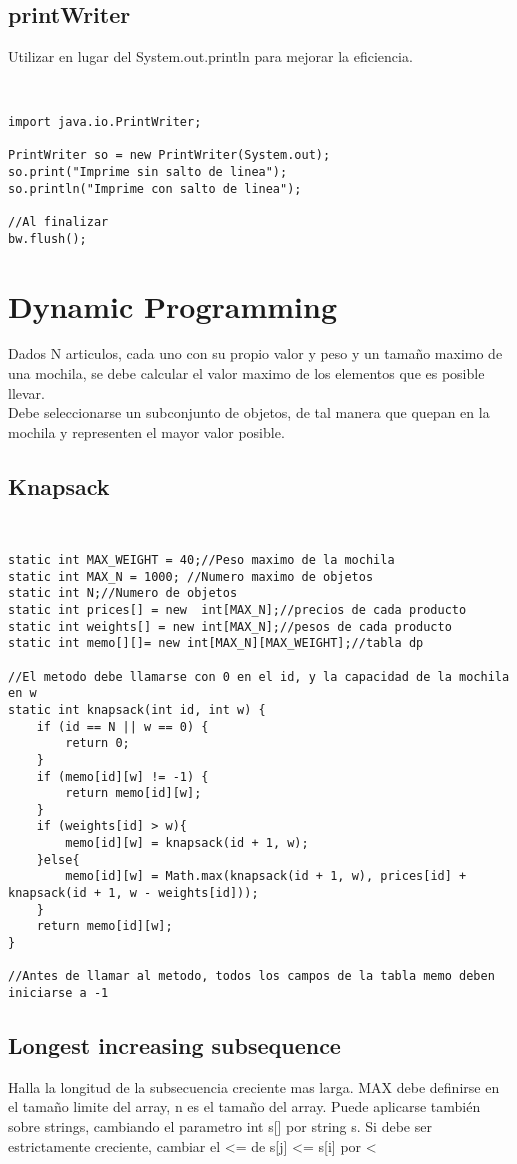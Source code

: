 \documentclass[11pt,letterpaper,twocolumn,twosided]{article}
\begin{document}
\subsection{printWriter}
Utilizar en lugar del System.out.println para mejorar la eficiencia.
\begin{lstlisting}


import java.io.PrintWriter;

PrintWriter so = new PrintWriter(System.out);
so.print("Imprime sin salto de linea");
so.println("Imprime con salto de linea");

//Al finalizar
bw.flush();
\end{lstlisting}

\section{Dynamic Programming}
Dados N articulos, cada uno con su propio valor y peso y un tama\~no maximo de una mochila, se debe calcular el valor maximo de los elementos que es posible llevar.\\
Debe seleccionarse un subconjunto de objetos, de tal manera que quepan en la mochila y representen el mayor valor posible.

\subsection{Knapsack}
\begin{lstlisting}


static int MAX_WEIGHT = 40;//Peso maximo de la mochila
static int MAX_N = 1000; //Numero maximo de objetos
static int N;//Numero de objetos 
static int prices[] = new  int[MAX_N];//precios de cada producto
static int weights[] = new int[MAX_N];//pesos de cada producto
static int memo[][]= new int[MAX_N][MAX_WEIGHT];//tabla dp

//El metodo debe llamarse con 0 en el id, y la capacidad de la mochila en w
static int knapsack(int id, int w) {
  	if (id == N || w == 0) {
  		return 0;
  	}
  	if (memo[id][w] != -1) {
  		return memo[id][w];
  	}
  	if (weights[id] > w){
  		memo[id][w] = knapsack(id + 1, w);
  	}else{
  		memo[id][w] = Math.max(knapsack(id + 1, w), prices[id] + knapsack(id + 1, w - weights[id]));
  	}
  	return memo[id][w];
}

//Antes de llamar al metodo, todos los campos de la tabla memo deben iniciarse a -1	
\end{lstlisting}

\subsection{Longest increasing subsequence}
Halla la longitud de la subsecuencia creciente mas larga. MAX debe definirse en el tama\~no  limite del array, n es el tama\~no del array. Puede aplicarse tambi\'en sobre strings, cambiando el parametro int s[] por string s. Si debe ser estrictamente creciente, cambiar el <= de s[j] <= s[i] por <
\end{document}
